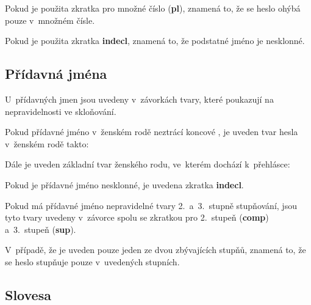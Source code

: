 \blspace
  \dicEntry {}  
\blspace

Pokud je použita zkratka pro množné číslo (\textbf{pl}), znamená to, že se heslo ohýbá pouze v~množném čísle.

\blspace
  \dicEntry {}  
\blspace

Pokud je použita zkratka \textbf{indecl}, znamená to, že podstatné jméno je nesklonné.

\blspace
  \dicEntry {}  
\blspace

\subsection*{Přídavná jména}

U~přídavných jmen jsou uvedeny v~závorkách tvary, které poukazují na nepravidelnosti ve skloňování.

Pokud přídavné jméno v~ženském rodě neztrácí koncové , je uveden tvar hesla v~ženském rodě takto:

\blspace
  \dicEntry {}  
\blspace

Dále je uveden základní tvar ženského rodu, ve~kterém dochází k~přehlásce:

\blspace
  \dicEntry {}  
\blspace

Pokud je přídavné jméno nesklonné, je uvedena zkratka \textbf{indecl}.

\blspace
  \dicEntry {}  
\blspace

Pokud má přídavné jméno nepravidelné tvary 2.~a~3.~stupně stupňování, jsou tyto tvary uvedeny v~závorce spolu se zkratkou pro 2.~stupeň (\textbf{comp}) a~3.~stupeň (\textbf{sup}).

\blspace
  \dicEntry {}  
\blspace

V~případě, že je uveden pouze jeden ze dvou zbývajících stupňů, znamená to, že se heslo stupňuje pouze v~uvedených stupních.

\blspace
  \dicEntry {}  
\blspace

\subsection*{Slovesa}

